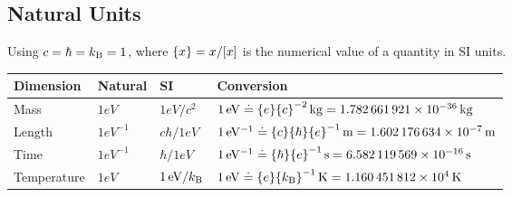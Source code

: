 	\subsection{Natural Units}
	Using $c=\hbar=k_{\text{B}}=1$, where $\qty{x}=x/\qty[x]$ is the numerical value of a quantity in SI units.
	\begin{center}		
		\begin{tabular}{| L{.15\textwidth} L{.1\textwidth} L{.1\textwidth} L{.5\textwidth} |}
			\hline
			Dimension & Natural & SI & Conversion \\ \hline \hline
			Mass & $1\unit{eV}$ & $1\unit{eV} / c^2$ & $1\,\mathrm{eV}\doteq \qty{e}\qty{c}^{-2}\,\mathrm{kg}=1.782\,661\,921\times 10^{-36}\,\mathrm{kg}$ \\ \hline
			Length & $1\unit{eV^{-1}}$ & $c \hbar / 1 \unit{eV}$ & $1\,\mathrm{eV^{-1}}\doteq \qty{c}\qty{\hbar}\qty{e}^{-1}\,\mathrm{m}=1.602\,176\,634\times 10^{-7}\,\mathrm{m}$ \\ \hline
			Time & $1\unit{eV^{-1}}$ & $\hbar / 1 \unit{eV}$ & $1\,\mathrm{eV^{-1}}\doteq \qty{\hbar}\qty{e}^{-1}\,\mathrm{s}=6.582\,119\,569\times 10^{-16}\,\mathrm{s}$ \\ \hline
			Temperature & $1\unit{eV}$ & $1\,\mathrm{eV} / k_{\text{B}}$ & $1\,\mathrm{eV}\doteq \qty{e}\qty{k_{\text{B}}}^{-1}\,\mathrm{K}=1.160\,451\,812\times 10^{4}\,\mathrm{K}$ \\ \hline
		\end{tabular}
		\end{center}